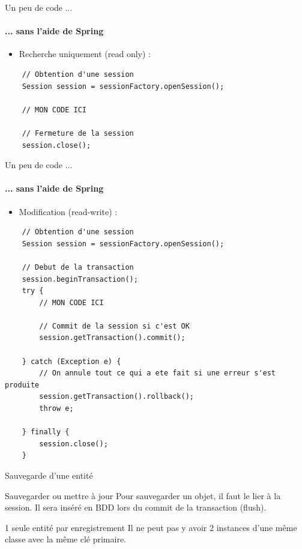 \documentclass[compact]{beamer}%
\begin{document}
\begin{frame}[containsverbatim]{Un peu de code ...}
	\framesubtitle{... sans l'aide de Spring}
	
	\begin{itemize}
	\item Recherche uniquement (read only) : 	
	\end{itemize}	
	\begin{lstlisting}
	// Obtention d'une session
	Session session = sessionFactory.openSession();
	
	// MON CODE ICI	
	
	// Fermeture de la session
	session.close();
	\end{lstlisting}
	
\end{frame}

\begin{frame}[containsverbatim]{Un peu de code ...}
	\framesubtitle{... sans l'aide de Spring}
	
	\begin{itemize}
	\item Modification (read-write) :
	\end{itemize}	
	\begin{lstlisting}
	// Obtention d'une session
	Session session = sessionFactory.openSession();
 
 	// Debut de la transaction
	session.beginTransaction();
	try {
		// MON CODE ICI	
	
		// Commit de la session si c'est OK
		session.getTransaction().commit();
		
	} catch (Exception e) {
		// On annule tout ce qui a ete fait si une erreur s'est produite
		session.getTransaction().rollback();
		throw e;
		
	} finally {
		session.close();
	}
	\end{lstlisting}
	
\end{frame}


\begin{frame}{Sauvegarde d'une entité}
 	
 	\begin{block}{Sauvegarder ou mettre à jour}
	Pour sauvegarder un objet, il faut le lier à la session. Il sera inséré en BDD lors du commit de la transaction (flush).
	\end{block}
	
	\pause
	\begin{alertblock}{1 seule entité par enregistrement}
	Il ne peut pas y avoir 2 instances d'une même classe avec la même clé primaire.
	\end{alertblock}
	
\end{frame}
\end{document}
